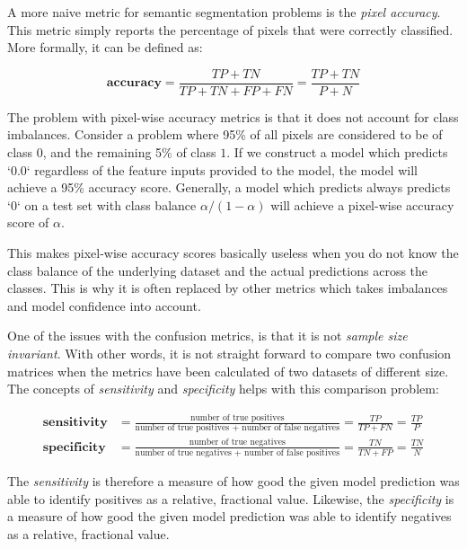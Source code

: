 A more naive metric for semantic segmentation problems is the \textit{pixel accuracy}.
This metric simply reports the percentage of pixels that were correctly classified.
More formally, it can be defined as:

\begin{equation*}
    \textbf{accuracy} = \frac{TP + TN}{TP + TN + FP + FN} = \frac{TP + TN}{P + N}
\end{equation*}

The problem with pixel-wise accuracy metrics is that it does not account for class imbalances.
Consider a problem where 95\% of all pixels are considered to be of class $0$, and the remaining 5\% of class $1$.
If we construct a model which predicts `0.0` regardless of the feature inputs provided to the model, the model will achieve a 95\% accuracy score.
Generally, a model which predicts always predicts `0` on a test set with class balance $\alpha / (1 - \alpha)$ will achieve a pixel-wise accuracy score of $\alpha$.

This makes pixel-wise accuracy scores basically useless when you do not know the class balance of the underlying dataset and the actual predictions across the classes.
This is why it is often replaced by other metrics which takes imbalances and model confidence into account.

One of the issues with the confusion metrics, is that it is not \textit{sample size invariant}.
With other words, it is not straight forward to compare two confusion matrices when the metrics have been calculated of two datasets of different size. The concepts of \textit{sensitivity} and \textit{specificity} helps with this comparison problem:

\begin{align*}
    \textbf{sensitivity}
    &=
    \frac{\text{number of true positives}}{\text{number of true positives + number of false negatives}}
    =
    \frac{TP}{TP + FN}
    =
    \frac{TP}{P}
    \\
    \textbf{specificity}
    &=
    \frac{\text{number of true negatives}}{\text{number of true negatives + number of false positives}}
    =
    \frac{TN}{TN + FP}
    =
    \frac{TN}{N}
\end{align*}

The \textit{sensitivity} is therefore a measure of how good the given model prediction was able to identify positives as a relative, fractional value.
Likewise, the \textit{specificity} is a measure of how good the given model prediction was able to identify negatives as a relative, fractional value.
